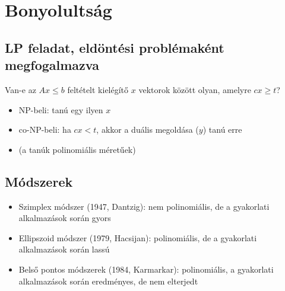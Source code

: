 \newpage

\section*{Bonyolultság}
\subsection*{LP feladat, eldöntési problémaként megfogalmazva}
Van-e az $Ax\leq b$ feltételt kielégítő $x$ vektorok között olyan, amelyre $cx\geq t$?
\begin{itemize}
	\item NP-beli: tanú egy ilyen $x$
	\item co-NP-beli: ha $cx<t$, akkor a duális megoldása ($y$) tanú erre
	\item (a tanúk polinomiális méretűek)
\end{itemize}

\subsection*{Módszerek}
\begin{itemize}
\item Szimplex módszer (1947, Dantzig): nem polinomiális, de a gyakorlati alkalmazások során gyors
\item Ellipszoid módszer (1979, Hacsijan): polinomiális, de a gyakorlati alkalmazások során lassú
\item Belső pontos módszerek (1984, Karmarkar): polinomiális, a gyakorlati alkalmazások során eredményes, de nem elterjedt
\end{itemize}
